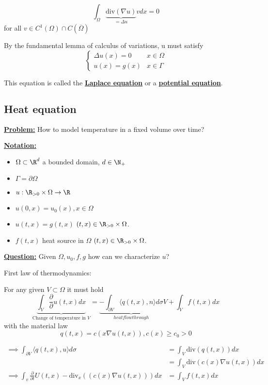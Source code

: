 \[\int_\Omega  \underbrace{\text{div}(\nabla u)}_{=\Delta u}vdx=0\]
for all $v\in C^1(\Omega)\cap C(\overline{\Omega})$

By the fundamental lemma of calculus of variations, u must satisfy
\[\begin{cases}
    \Delta u (x)=0 & x\in\Omega\\
    u(x)=g(x) & x\in \Gamma
\end{cases}\]

This equation is called the \underline{\textbf{Laplace equation}} or a \underline{\textbf{potential equation}}.



\subsection{Heat equation}

\underline{\textbf{Problem:}} How to model temperature in a fixed volume over time?

\underline{\textbf{Notation:}} 
\begin{itemize}
    \item $\Omega\subset \R^d$ a bounded domain, $d\in \N_+$
    \item $\Gamma = \partial \Omega$
    \item $u: \R_{>0}\times \Omega \to \R$
    \item $u(0,x)=u_0(x),x\in \Omega$
    \item $u(t,x)=g(t,x)$ $(t,x)\in \R_{>0}\times \Omega$.
    \item $f(t,x)$ heat source in $\Omega$ $(t,x)\in \R_{>0}\times \Omega$.
\end{itemize}

\underline{\textbf{Question:}} Given $\Omega,u_0,f,g$ how can we characterize $u$?

First law of thermodynamics:

For any given $V\subset \Omega$ it must hold
\[\underbrace{\int_V \frac{\partial}{\partial}u(t,x)dx}_{\text{Change of temperature in }V}=\underbrace{-\int_{\partial V} \langle q(t,x),n \rangle d\sigma}_{heat flow through }V+\int_V f(t,x)dx\]
with the material law
\[q(t,x)=c(x\nabla u(t,x)), c(x)\geq c_0>0\]

\begin{align*}
    \implies \int_{\partial V} \langle q(t,x),u \rangle d\sigma  &= \int_V\text{div}(q(t,x))dx\\
    &=\int_V\text{div}(c(x)\nabla u(t,x))dx\\
    \implies \int_v \frac{\partial}{\partial t} U(t,x)-\text{div}_x((c(x)\nabla u(t,x)))dx &=\int_V f(t,x)dx
\end{align*}

